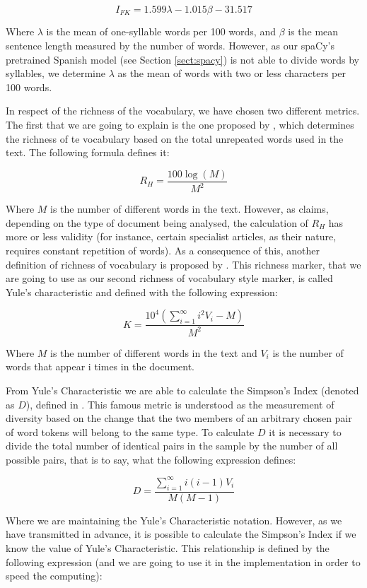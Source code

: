 $$
I_{FK} = 1.599\lambda-1.015\beta-31.517
$$

Where $\lambda$ is the mean of one-syllable words per 100 words, and $\beta$ is the mean sentence length measured by the number of words. However, as our spaCy's pretrained Spanish model (see Section \ref{sect:spacy}) is not able to divide words by syllables, we determine $\lambda$ as the mean of words with two or less characters per 100 words.

In respect of the richness of the vocabulary, we have chosen two different metrics. The first that we are going to explain is the one proposed by \cite{honore1979some}, which determines the richness of te vocabulary based on the total unrepeated words used in the text. The following formula defines it:

$$
R_H = \frac{100\log(M)}{M^2}
$$

Where $M$ is the number of different words in the text. However, as \cite{ril2014determination} claims, depending on the type of document being analysed, the calculation of $R_H$ has more or less validity (for instance, certain specialist articles, as their nature, requires constant repetition of words). As a consequence of this, another definition of richness of vocabulary is proposed by \cite{yule2014statistical}. This richness marker, that we are going to use as our second richness of vocabulary style marker, is called Yule's characteristic and defined with the following expression:

$$
K = \frac{10^4\left(\sum_{i = 1}^\infty i^2V_i-M\right)}{M^2}
$$

Where $M$ is the number of different words in the text and $V_i$ is the number of words that appear i times in the document.

From Yule's Characteristic we are able to calculate the Simpson's Index (denoted as $D$), defined in \cite{simpson1949measurement}. This famous metric is understood as the measurement of diversity based on the change that the two members of an arbitrary chosen pair of word tokens will belong to the same type. To calculate $D$ it is necessary to divide the total number of identical pairs in the sample by the number of all possible pairs, that is to say, what the following expression defines:

$$
D = \frac{\sum_{i = 1}^\infty i(i-1)V_i}{M(M-1)}
$$

Where we are maintaining the Yule's Characteristic notation. However, as we have transmitted in advance, it is possible to calculate the Simpson's Index if we know the value of Yule's Characteristic. This relationship is defined by the following expression (and we are going to use it in the implementation in order to speed the computing):

